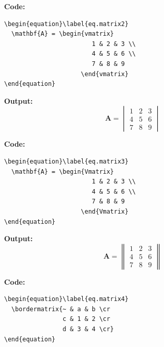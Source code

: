 \documentclass{book}
\newcommand{\myc}{\noindent\textbf{{\color{blue} Code}:}}
\newcommand{\myo}{\noindent\textbf{{\color{blue} Output}:\\}}
\begin{document}
\myc
\begin{lstlisting}
\begin{equation}\label{eq.matrix2}
  \mathbf{A} = \begin{vmatrix}
                        1 & 2 & 3 \\
                        4 & 5 & 6 \\
                        7 & 8 & 9
                     \end{vmatrix}
\end{equation}
\end{lstlisting}

\myo
\begin{equation}\label{eq.matrix2}
  \mathbf{A} = \begin{vmatrix}
                        1 & 2 & 3 \\
                        4 & 5 & 6 \\
                        7 & 8 & 9
                     \end{vmatrix}
\end{equation}

\myc
\begin{lstlisting}
\begin{equation}\label{eq.matrix3}
  \mathbf{A} = \begin{Vmatrix}
                        1 & 2 & 3 \\
                        4 & 5 & 6 \\
                        7 & 8 & 9
                     \end{Vmatrix}
\end{equation}
\end{lstlisting}

\myo
\begin{equation}\label{eq.matrix3}
  \mathbf{A} = \begin{Vmatrix}
                        1 & 2 & 3 \\
                        4 & 5 & 6 \\
                        7 & 8 & 9
                     \end{Vmatrix}
\end{equation}

\myc
\begin{lstlisting}
\begin{equation}\label{eq.matrix4}
  \bordermatrix{~ & a & b \cr
                c & 1 & 2 \cr
                d & 3 & 4 \cr}
\end{equation}
\end{lstlisting}
\end{document}

